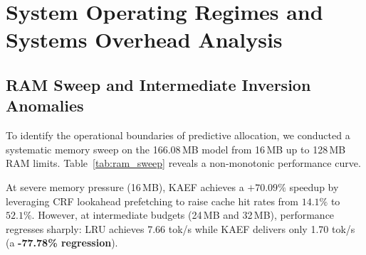 \section{System Operating Regimes and Systems Overhead Analysis}
\label{sec:regimes}

\subsection{RAM Sweep and Intermediate Inversion Anomalies}
To identify the operational boundaries of predictive allocation, we conducted a systematic memory sweep on the 166.08\,MB model from 16\,MB up to 128\,MB RAM limits. Table~\ref{tab:ram_sweep} reveals a non-monotonic performance curve.

\begin{table}[h]
\caption{System performance across memory budgets on the 166\,MB model. At intermediate budgets (24--48\,MB), KAEF suffers performance regressions due to cache thrashing and controller decision overhead.}
\label{tab:ram_sweep}
\centering
{}
\end{table}

At severe memory pressure (16\,MB), KAEF achieves a $+70.09\%$ speedup by leveraging CRF lookahead prefetching to raise cache hit rates from $14.1\%$ to $52.1\%$. However, at intermediate budgets (24\,MB and 32\,MB), performance regresses sharply: LRU achieves 7.66 tok/s while KAEF delivers only 1.70 tok/s (a \textbf{-77.78\% regression}).

